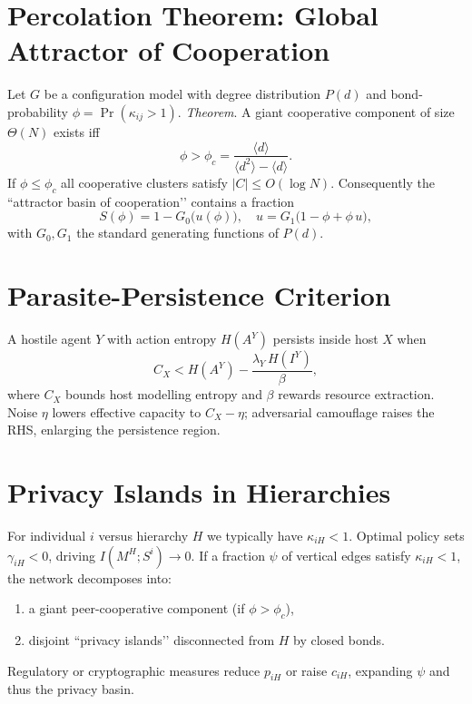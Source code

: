 \documentclass[10pt,conference]{IEEEtran}
\begin{document}
\section{Percolation Theorem: Global Attractor of Cooperation}

Let \(G\) be a configuration model with degree distribution \(P(d)\) and bond-probability \(\phi=\Pr(\kappa_{ij}>1)\).  
\emph{Theorem}.  A giant cooperative component of size \(\Theta(N)\) exists iff
\[
\phi>\phi_c=\frac{\langle d\rangle}{\langle d^2\rangle-\langle d\rangle}.
\]
If \(\phi\le\phi_c\) all cooperative clusters satisfy \(|C|\le O(\log N)\).  
Consequently the “attractor basin of cooperation’’ contains a fraction
\[
S(\phi)=1-G_0\!\bigl(u(\phi)\bigr),
\quad
u=G_1\!\bigl(1-\phi+\phi\,u\bigr),
\]
with \(G_0,G_1\) the standard generating functions of \(P(d)\).

\section{Parasite-Persistence Criterion}

A hostile agent \(Y\) with action entropy \(H(A^Y)\) persists inside host \(X\) when
\[
C_X < H(A^Y)-\frac{\lambda_Y\,H(I^Y)}{\beta},
\]
where \(C_X\) bounds host modelling entropy and \(\beta\) rewards resource extraction.  
Noise \(\eta\) lowers effective capacity to \(C_X-\eta\); adversarial camouflage raises the RHS, enlarging the persistence region.

\section{Privacy Islands in Hierarchies}

For individual \(i\) versus hierarchy \(H\) we typically have \(\kappa_{iH}<1\).  
Optimal policy sets \(\gamma_{iH}<0\), driving \(I(M^H;S^i)\!\to\!0\).  
If a fraction \(\psi\) of vertical edges satisfy \(\kappa_{iH}<1\), the network decomposes into:
\begin{enumerate}
\item a giant peer-cooperative component (if \(\phi>\phi_c\)),
\item disjoint “privacy islands’’ disconnected from \(H\) by closed bonds.
\end{enumerate}
Regulatory or cryptographic measures reduce \(p_{iH}\) or raise \(c_{iH}\), expanding \(\psi\) and thus the privacy basin.
\end{document}
